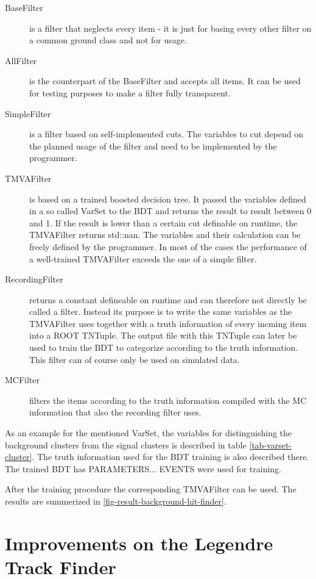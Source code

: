 \begin{description}
  \item[BaseFilter] is a filter that neglects every item - it is just for basing every other filter on a common ground class and not for usage.
  \item[AllFilter] is the counterpart of the BaseFilter and accepts all items. It can be used for testing purposes to make a filter fully transparent.
  \item[SimpleFilter] is a filter based on self-implemented cuts. The variables to cut depend on the planned usage of the filter and need to be implemented by the programmer.
  \item[TMVAFilter] is based on a trained boosted decision tree. It passed the variables defined in a so called VarSet to the BDT and returns the result to result between 0 and 1. If the result is lower than a certain cut definable on runtime, the TMVAFilter returns std::nan. The variables and their calculation can be freely defined by the programmer. In most of the cases the performance of a well-trained TMVAFilter exceeds the one of a simple filter.
  \item[RecordingFilter] returns a constant defineable on runtime and can therefore not directly be called a filter. Instead its purpose is to write the same variables as the TMVAFilter uses together with a truth information of every incming item into a ROOT TNTuple. The output file with this TNTuple can later be used to train the BDT to categorize according to the truth information. This filter can of course only be used on simulated data.
  \item[MCFilter] filters the items according to the truth information compiled with the MC information that also the recording filter uses. 
\end{description}

As an example for the mentioned VarSet, the variables for distinguishing the background clusters from the signal clusters is described in table \ref{tab-varset-cluster}. The truth information used for the BDT training is also described there. The trained BDT has PARAMETERS... EVENTS were used for training. 

After the training procedure the corresponding TMVAFilter can be used. The results are summerized in \ref{fig-result-background-hit-finder}. 


\section{Improvements on the Legendre Track Finder}
